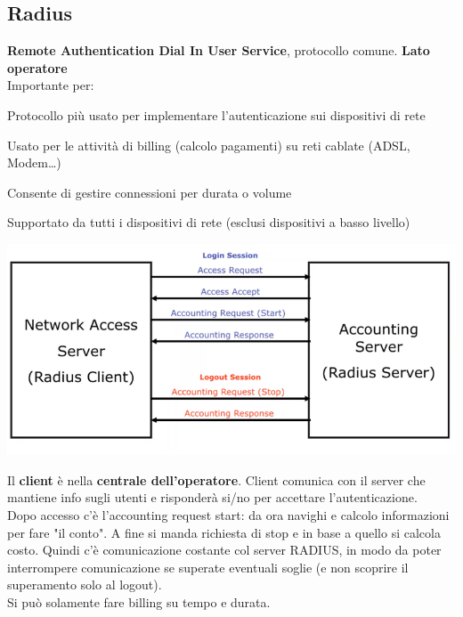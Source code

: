 \documentclass[10pt]{book}
\begin{document}
\subsection{Radius} \textbf{Remote Authentication Dial In User Service}, protocollo comune. \textbf{Lato operatore}\\
Importante per:
\begin{list}{}{}
	\item Protocollo più usato per implementare l'autenticazione sui dispositivi di rete
	\item Usato per le attività di billing (calcolo pagamenti) su reti cablate (ADSL, Modem\ldots)
	\item Consente di gestire connessioni per durata o volume
	\item Supportato da tutti i dispositivi di rete (esclusi dispositivi a basso livello)
\end{list}
\begin{center}
	\includegraphics[scale=0.5]{radius.png}
\end{center}
Il \textbf{client} è nella \textbf{centrale dell'operatore}. Client comunica con il server che mantiene info sugli utenti e risponderà si/no per accettare l'autenticazione.\\
Dopo accesso c'è l'accounting request start: da ora navighi e calcolo informazioni per fare "il conto". A fine si manda richiesta di stop e in base a quello si calcola  costo. Quindi c'è comunicazione costante col server RADIUS, in modo da poter interrompere comunicazione se superate eventuali soglie (e non scoprire il superamento solo al logout).\\
Si può solamente fare billing su tempo e durata.
\end{document}
